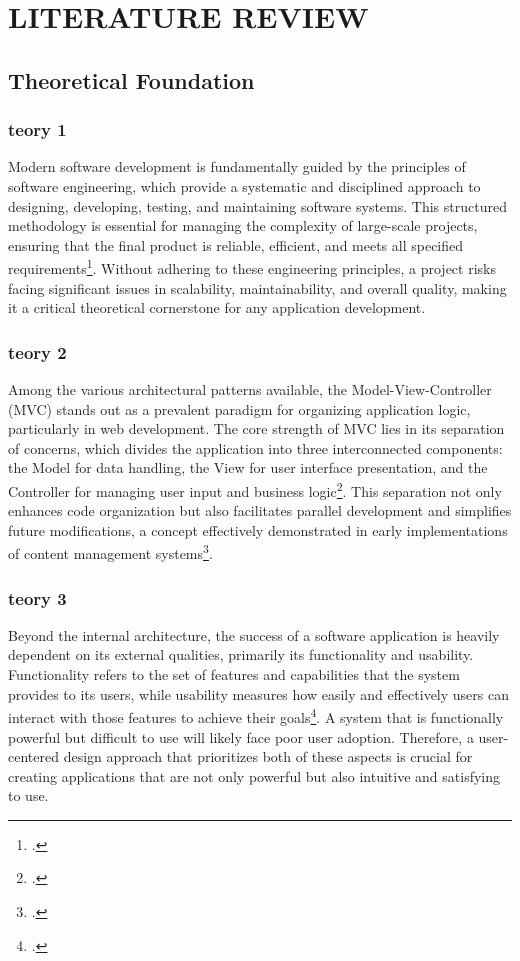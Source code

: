 \chapter{LITERATURE REVIEW}
	\section{Theoretical Foundation}
		\subsection{teory 1}
		\setlength{\leftskip}{1.4cm}
		Modern software development is fundamentally guided by the principles of software engineering, which provide a systematic and disciplined approach to designing, developing, testing, and maintaining software systems. This structured methodology is essential for managing the complexity of large-scale projects, ensuring that the final product is reliable, efficient, and meets all specified requirements\footcite{sommerville2016}. Without adhering to these engineering principles, a project risks facing significant issues in scalability, maintainability, and overall quality, making it a critical theoretical cornerstone for any application development.

		\subsection{teory 2}
		Among the various architectural patterns available, the Model-View-Controller (MVC) stands out as a prevalent paradigm for organizing application logic, particularly in web development. The core strength of MVC lies in its separation of concerns, which divides the application into three interconnected components: the Model for data handling, the View for user interface presentation, and the Controller for managing user input and business logic\footcite{majeed2018}. This separation not only enhances code organization but also facilitates parallel development and simplifies future modifications, a concept effectively demonstrated in early implementations of content management systems\footcite{kristoko2009}.
		
		\subsection{teory 3}
		Beyond the internal architecture, the success of a software application is heavily dependent on its external qualities, primarily its functionality and usability. Functionality refers to the set of features and capabilities that the system provides to its users, while usability measures how easily and effectively users can interact with those features to achieve their goals\footcite{goodwin1987}. A system that is functionally powerful but difficult to use will likely face poor user adoption. Therefore, a user-centered design approach that prioritizes both of these aspects is crucial for creating applications that are not only powerful but also intuitive and satisfying to use.
		
